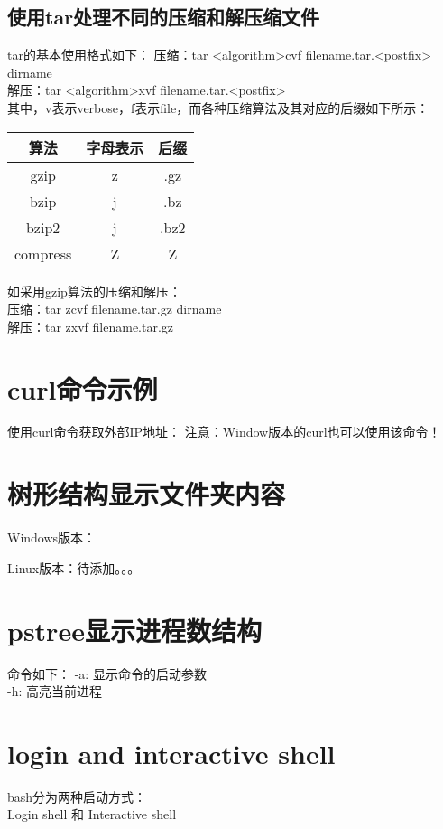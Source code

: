 \documentclass[a4paper,11pt]{article}
\begin{document}
  \subsection[使用tar处理不同的压缩和解压缩文件]{使用tar处理不同的压缩和解压缩文件}
  tar的基本使用格式如下：
  压缩：tar <algorithm>cvf filename.tar.<postfix> dirname\\
  解压：tar <algorithm>xvf filename.tar.<postfix>\\
  其中，v表示verbose，f表示file，而各种压缩算法及其对应的后缀如下所示：\par
  \begin{center}
  \begin{tabular}{ccc}
    \hline
    算法 & 字母表示 & 后缀\\ \hline
    gzip & z & .gz\\
    bzip & j & .bz\\
    bzip2 & j & .bz2\\
    compress & Z & Z\\ \hline
  \end{tabular}
  \end{center}
  如采用gzip算法的压缩和解压：\\
  压缩：tar zcvf filename.tar.gz dirname\\
  解压：tar zxvf filename.tar.gz


  \section[curl命令示例]{curl命令示例}
  使用curl命令获取外部IP地址：
  注意：Window版本的curl也可以使用该命令！


  \section[树形结构显示文件夹内容]{树形结构显示文件夹内容}
  Windows版本：

  Linux版本：待添加。。。


  \section[pstree显示进程数结构]{pstree显示进程数结构}
  命令如下：
  -a: 显示命令的启动参数\\
  -h: 高亮当前进程


  \section[login and interactive shell]{login and interactive shell}
  bash分为两种启动方式：\\
  Login shell 和 Interactive shell
\end{document}
